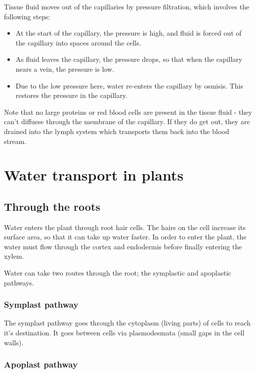 \documentclass{article}
\begin{document}
Tissue fluid moves out of the capillaries by pressure filtration, which involves
the following steps:

\begin{itemize}

	\item At the start of the capillary, the pressure is high, and fluid is
	forced out of the capillary into spaces around the cells.

	\item As fluid leaves the capillary, the pressure drops, so that when the
	capillary nears a vein, the pressure is low.

	\item Due to the low pressure here, water re-enters the capillary by
	osmisis. This restores the pressure in the capillary.

\end{itemize}

Note that no large proteins or red blood cells are present in the tissue fluid -
they can't diffuese through the membrane of the capillary. If they do get out,
they are drained into the lymph system which transports them back into the blood
stream.

\section*{Water transport in plants}

\subsection*{Through the roots}

Water enters the plant through root hair cells. The hairs on the cell increase
its surface area, so that it can take up water faster. In order to enter the
plant, the water must flow through the cortex and endodermis before finally
entering the xylem.

Water can take two routes through the root; the symplastic and apoplastic
pathways.

\subsubsection*{Symplast pathway}

The symplast pathway goes through the cytoplasm (living parts) of cells to reach it's
destination. It goes between cells via plasmodesmata (small gaps in the cell
walls).

\subsubsection*{Apoplast pathway}
\end{document}
